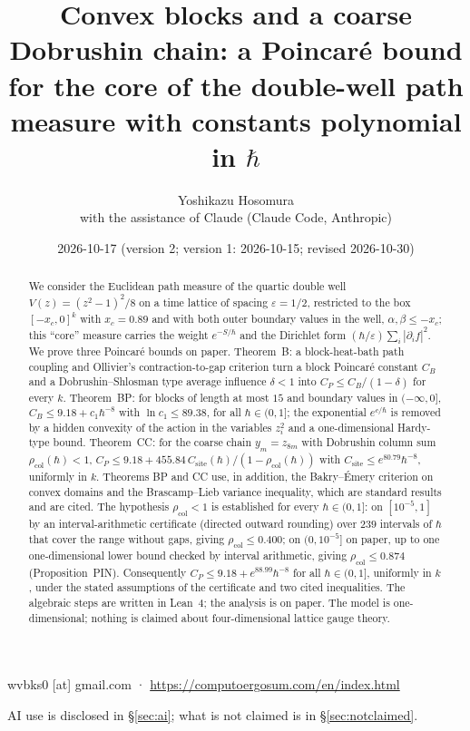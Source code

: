 \documentclass[11pt,a4paper]{article}
\title{Convex blocks and a coarse Dobrushin chain: a Poincar\'e bound for the core of the double-well path measure with constants polynomial in $\hbar$}
\author{Yoshikazu Hosomura\\[.3em]\normalsize with the assistance of Claude (Claude Code, Anthropic)}
\date{2026-10-17 (version 2; version 1: 2026-10-15; revised 2026-10-30)}
\theoremstyle{definition}
\theoremstyle{remark}
\newcommand{\xc}{x_c}
\newcommand{\rcol}{\rho_{\mathrm{col}}}
\newcommand{\Csite}{C_{\mathrm{site}}}
\begin{document}
\maketitle
\begin{center}\small wvbks0 [at] gmail.com · \url{https://computoergosum.com/en/index.html}\end{center}
\begin{center}\small AI use is disclosed in \S\ref{sec:ai}; what is not claimed is in \S\ref{sec:notclaimed}.\end{center}

\begin{abstract}
We consider the Euclidean path measure of the quartic double well $V(z)=(z^2-1)^2/8$ on a time lattice of spacing $\varepsilon=1/2$, restricted to the box $[-\xc,0]^k$ with $\xc=0.89$ and with both outer boundary values in the well, $\alpha,\beta\le-\xc$; this ``core'' measure carries the weight $e^{-S/\hbar}$ and the Dirichlet form $(\hbar/\varepsilon)\sum_i|\partial_if|^2$. We prove three Poincar\'e bounds on paper. Theorem~B: a block-heat-bath path coupling and Ollivier's contraction-to-gap criterion turn a block Poincar\'e constant $C_B$ and a Dobrushin--Shlosman type average influence $\delta<1$ into $C_P\le C_B/(1-\delta)$ for every $k$. Theorem~BP: for blocks of length at most $15$ and boundary values in $(-\infty,0]$, $C_B\le 9.18+c_1\hbar^{-8}$ with $\ln c_1\le 89.38$, for all $\hbar\in(0,1]$; the exponential $e^{c/\hbar}$ is removed by a hidden convexity of the action in the variables $z_i^2$ and a one-dimensional Hardy-type bound. Theorem~CC: for the coarse chain $y_m=z_{8m}$ with Dobrushin column sum $\rcol(\hbar)<1$, $C_P\le 9.18+455.84\,\Csite(\hbar)/(1-\rcol(\hbar))$ with $\Csite\le e^{80.79}\hbar^{-8}$, uniformly in $k$. Theorems BP and CC use, in addition, the Bakry--\'Emery criterion on convex domains and the Brascamp--Lieb variance inequality, which are standard results and are cited. The hypothesis $\rcol<1$ is established for every $\hbar\in(0,1]$: on $[10^{-5},1]$ by an interval-arithmetic certificate (directed outward rounding) over $239$ intervals of $\hbar$ that cover the range without gaps, giving $\rcol\le0.400$; on $(0,10^{-5}]$ on paper, up to one one-dimensional lower bound checked by interval arithmetic, giving $\rcol\le0.874$ (Proposition~PIN). Consequently $C_P\le9.18+e^{88.99}\hbar^{-8}$ for all $\hbar\in(0,1]$, uniformly in $k$, under the stated assumptions of the certificate and two cited inequalities. The algebraic steps are written in Lean~4; the analysis is on paper. The model is one-dimensional; nothing is claimed about four-dimensional lattice gauge theory.
\end{abstract}
\end{document}
